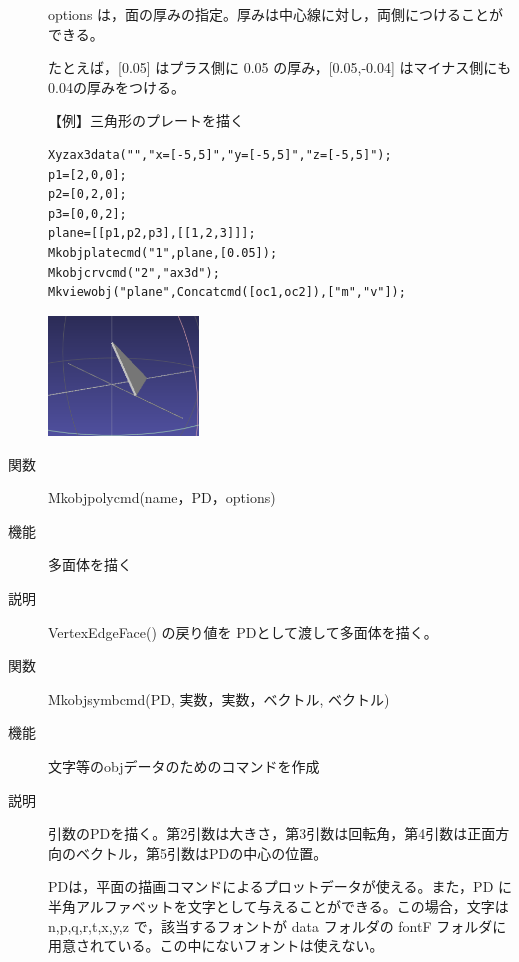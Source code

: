 \documentclass[papersize,a4paper,12pt,uplatex]{jsarticle}
\begin{document}
\begin{description}
options は，面の厚みの指定。厚みは中心線に対し，両側につけることができる。

たとえば，[0.05] はプラス側に 0.05 の厚み，[0.05,-0.04] はマイナス側にも0.04の厚みをつける。

\vspace{\baselineskip}
【例】三角形のプレートを描く

\begin{verbatim}
Xyzax3data("","x=[-5,5]","y=[-5,5]","z=[-5,5]");
p1=[2,0,0];
p2=[0,2,0];
p3=[0,0,2];
plane=[[p1,p2,p3],[[1,2,3]]];
Mkobjplatecmd("1",plane,[0.05]);
Mkobjcrvcmd("2","ax3d");
Mkviewobj("plane",Concatcmd([oc1,oc2]),["m","v"]); 
\end{verbatim}

\begin{center} \includegraphics[bb=0 0 287.01 228.01 , width=4cm]{Fig/meshlab03.pdf} \end{center}

\vspace{\baselineskip}
\hypertarget{mkobjpolycmd}{}
\item[関数]Mkobjpolycmd(name，PD，options)
\item[機能]多面体を描く
\item[説明]VertexEdgeFace() の戻り値を PDとして渡して多面体を描く。

\vspace{\baselineskip}
\hypertarget{mkobjsymbcmd}{}
\item[関数]Mkobjsymbcmd(PD, 実数，実数，ベクトル, ベクトル)
\item[機能]文字等のobjデータのためのコマンドを作成
\item[説明]引数のPDを描く。第2引数は大きさ，第3引数は回転角，第4引数は正面方向のベクトル，第5引数はPDの中心の位置。

PDは，平面の描画コマンドによるプロットデータが使える。また，PD に半角アルファベットを文字として与えることができる。この場合，文字は n,p,q,r,t,x,y,z で，該当するフォントが data フォルダの fontF フォルダに用意されている。この中にないフォントは使えない。


\end{description}
\end{document}
